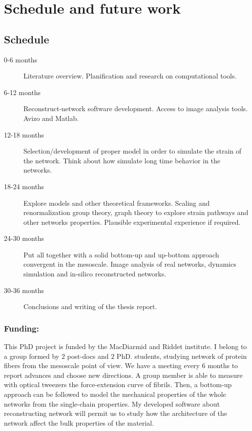 
\chapter{Schedule and future work} %

\label{Chapter-future} %



\section{Schedule}

\begin{description}
  \item[0-6 months] Literature overview. Planification and research on
  computational tools.
  \item[6-12 months] Reconstruct-network software development.
   Access to image analysis tools. Avizo and Matlab.
  \item[12-18 months] Selection/development of proper model in order to simulate
  the strain of the network. Think about how simulate long time behavior in the
  networks.
  \item[18-24 months] Explore models and other theoretical frameworks.
  Scaling and renormalization group theory, graph theory to explore strain
  pathways and other networks properties. Plausible experimental experience if
  required.
  \item[24-30 months] Put all together with a solid bottom-up and up-bottom
   approach convergent in the mesoscale. Image analysis of real networks,
   dynamics simulation and in-silico reconstructed networks.
   \item[30-36 months] Conclusions and writing of the
   thesis report.
\end{description}

\subsection{Funding:}
This PhD project is funded by the MacDiarmid and Riddet
institute. I belong to a group formed by $2$ post-docs and $2$ PhD. students,
studying network of protein fibers from the mesoscale point of view. We have a
meeting every $6$ months to report advances and choose new directions. A group
member is able to measure with optical tweezers the force-extension curve of
fibrils. Then, a bottom-up approach can be
followed\citep{schuster_investigating_2012} to model the mechanical properties of the
 whole networks from the single-chain properties. My developed software about
 reconstructing network will permit us to study how the architecture of the
 network affect the bulk properties of the
 material.

